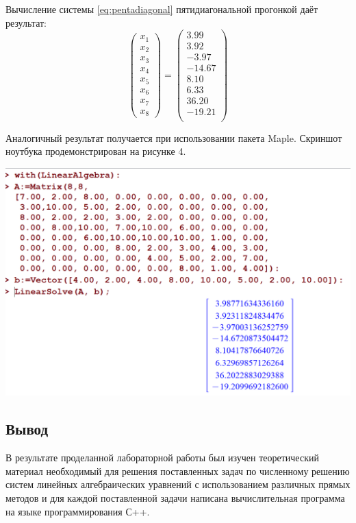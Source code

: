 \documentclass[a4paper, fontsize=14pt]{article}
\begin{document}
Вычисление системы \eqref{eq:pentadiagonal} пятидиагональной прогонкой даёт результат:
\begin{equation*}
    \begin{pmatrix}
       x_1\\x_2\\x_3\\x_4\\x_5\\x_6\\x_7\\x_8
    \end{pmatrix}
    =
    \begin{pmatrix}
        3.99\\  3.92\\ -3.97\\-14.67\\  8.10\\  6.33\\ 36.20\\-19.21\\
    \end{pmatrix}
\end{equation*}

Аналогичный результат получается при использовании пакета Maple. Скриншот ноутбука продемонстрирован на рисунке 4.

\begin{center}
    \label{maple}
        \includegraphics[scale=0.3]{src/maple_sol.png}
\end{center}
\newpage
\subsection*{Вывод}
В результате проделанной лабораторной работы был изучен теоретический материал необходимый для решения поставленных задач по численному решению систем линейных алгебраических уравнений с использованием различных прямых методов и для каждой поставленной задачи написана вычислительная программа на языке программирования С++.
\newpage
\end{document}
